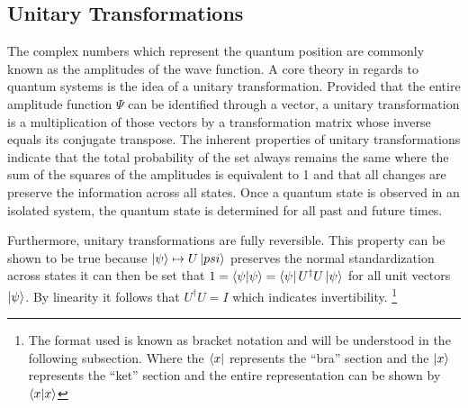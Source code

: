 \documentclass[12pt]{article}
\begin{document}
\subsection{Unitary Transformations}
The complex numbers which represent the quantum position are commonly known as the amplitudes of the wave function. A core theory in regards to quantum systems is the idea of a unitary transformation. Provided that the entire amplitude function $\Psi$ can be identified through a vector, a unitary transformation is a multiplication of those vectors by a transformation matrix whose inverse equals its conjugate transpose. \cite{cis4930}
The inherent properties of unitary transformations indicate that the total probability of the set always remains the same where the sum of the squares of the amplitudes is equivalent to 1 and that all changes are preserve the information across all states. Once a quantum state is observed in an isolated system, the quantum state is determined for all past and future times.\par
Furthermore, unitary transformations are fully reversible. This property can be shown to be true because $\ket{\psi} \mapsto U\ket{psi}$ preserves the normal standardization across states it can then be set that $1 = \bra{\psi}\ket{\psi} = \bra{\psi}U^ \dagger U\ket{\psi} $ for all unit vectors $\ket{\psi}$. By linearity it follows that $U^\dagger U = I$ which indicates invertibility. 
\footnote{The format used is known as bracket notation and will be understood in the following subsection. Where the $\bra{x}$ represents the ``bra'' section and the $\ket{x}$ represents the ``ket'' section and the entire representation can be shown by $\bra{x}\ket{x}$}
\end{document}
